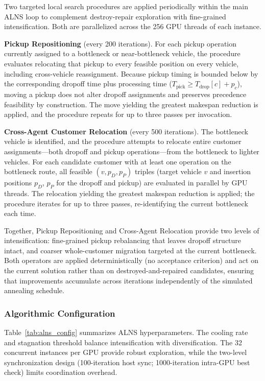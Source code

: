 \documentclass{article}
\begin{document}
Two targeted local search procedures are applied periodically within the main ALNS loop to complement destroy-repair exploration with fine-grained intensification. Both are parallelized across the 256 GPU threads of each instance.

\textbf{Pickup Repositioning} (every 200 iterations). For each pickup operation currently assigned to a bottleneck or near-bottleneck vehicle, the procedure evaluates relocating that pickup to every feasible position on every vehicle, including cross-vehicle reassignment. Because pickup timing is bounded below by the corresponding dropoff time plus processing time ($T_{\text{pick}} \geq T_{\text{drop}}[c] + p_c$), moving a pickup does not alter dropoff assignments and preserves precedence feasibility by construction. The move yielding the greatest makespan reduction is applied, and the procedure repeats for up to three passes per invocation.

\textbf{Cross-Agent Customer Relocation} (every 500 iterations). The bottleneck vehicle is identified, and the procedure attempts to relocate entire customer assignments—both dropoff and pickup operations—from the bottleneck to lighter vehicles. For each candidate customer with at least one operation on the bottleneck route, all feasible $(v, p_D, p_P)$ triples (target vehicle $v$ and insertion positions $p_D$, $p_P$ for the dropoff and pickup) are evaluated in parallel by GPU threads. The relocation yielding the greatest makespan reduction is applied; the procedure iterates for up to three passes, re-identifying the current bottleneck each time.

Together, Pickup Repositioning and Cross-Agent Relocation provide two levels of intensification: fine-grained pickup rebalancing that leaves dropoff structure intact, and coarser whole-customer migration targeted at the current bottleneck. Both operators are applied deterministically (no acceptance criterion) and act on the current solution rather than on destroyed-and-repaired candidates, ensuring that improvements accumulate across iterations independently of the simulated annealing schedule.

\subsubsection{Algorithmic Configuration}

Table~\ref{tab:alns_config} summarizes ALNS hyperparameters. The cooling rate and stagnation threshold balance intensification with diversification. The 32 concurrent instances per GPU provide robust exploration, while the two-level synchronization design (100-iteration host sync; 1000-iteration intra-GPU best check) limits coordination overhead.
\end{document}
